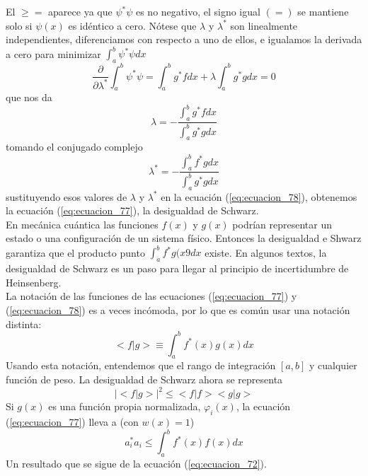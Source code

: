 El $\geq =$ aparece ya que $\psi^{*} \psi$ es no negativo, el signo igual $(=)$ se mantiene solo si $\psi(x)$ es idéntico a cero. Nótese que $\lambda$ y $\lambda^{*}$ son linealmente independientes, diferenciamos con respecto a uno de ellos, e igualamos la derivada a cero para minimizar $\int_{a}^{b} \psi^{*} \psi dx$
\begin{equation*}
\dfrac{\partial}{\partial \lambda^{*}} \int_{a}^{b} \psi^{*} \psi = \int_{a}^{b} g^{*} f dx  + \lambda \int_{a}^{b} g^{*} g dx = 0
\end{equation*}
que nos da
\begin{equation}
\lambda = - \dfrac{\int_{a}^{b} g^{*} f dx}{\int_{a}^{b} g^{*} g dx}
\label{eq:ecuacion_79a}
\end{equation}
tomando el conjugado complejo 
\begin{equation}
\lambda^{*} = - \dfrac{\int_{a}^{b} f^{*} g dx}{\int_{a}^{b} g^{*} g dx}
\label{eq:ecuacion_79b}
\end{equation}
sustituyendo esos valores de $\lambda$ y $\lambda^{*}$ en la ecuación (\ref{eq:ecuacion_78}), obtenemos la ecuación (\ref{eq:ecuacion_77}), la desigualdad de Schwarz.
\\
En mecánica cuántica las funciones $f(x)$ y $g(x)$ podrían representar un estado o una configuración de un sistema físico. Entonces la desigualdad e Shwarz garantiza que el producto punto $\int_{a}^{b} f^{*} g(x9 dx$ existe. En algunos textos, la desigualdad de Schwarz es un paso para llegar al principio de incertidumbre de Heinsenberg.
\\
La notación de las funciones de las ecuaciones (\ref{eq:ecuacion_77}) y (\ref{eq:ecuacion_78}) es a veces incómoda, por lo que es común usar una notación distinta:
\[ < f \vert g > \equiv \int_{a}^{b} f^{*}(x) g(x) dx \]
Usando esta notación, entendemos que el rango de integración $[a,b]$ y cualquier función de peso. La desigualdad de Schwarz ahora se representa
\begin{equation}
\vert <f \vert g > \vert^{2} \leq < f \vert f > < g \vert g >
\label{eq:ecuacion_77a}
\end{equation}
Si $g(x)$ es una función propia normalizada, $\varphi_{i}(x)$, la ecuación (\ref{eq:ecuacion_77}) lleva a (con $w(x)=1$)
\begin{equation}
a_{i}^{*} a_{i} \leq \int_{a}^{b} f^{*}(x) f(x) dx 
\label{eq:ecuacion_80}
\end{equation}
Un resultado que se sigue de la ecuación (\ref{eq:ecuacion_72}).

